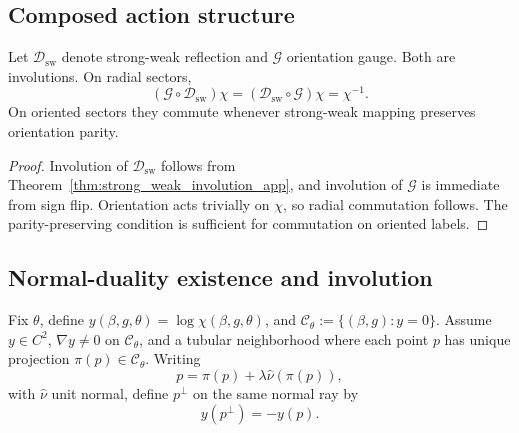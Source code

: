 \subsection{Composed action structure}

\begin{proposition}
\label{prop:composed_action_app}
Let \(\mathcal{D}_{\mathrm{sw}}\) denote strong-weak reflection and
\(\mathcal{G}\) orientation gauge.
Both are involutions.
On radial sectors,
\begin{equation}
  (\mathcal{G}\circ\mathcal{D}_{\mathrm{sw}})\chi
  =(\mathcal{D}_{\mathrm{sw}}\circ\mathcal{G})\chi
  =\chi^{-1}.
\end{equation}
On oriented sectors they commute whenever strong-weak mapping preserves orientation parity.
\end{proposition}
\begin{proof}
Involution of \(\mathcal{D}_{\mathrm{sw}}\) follows from
Theorem~\ref{thm:strong_weak_involution_app}, and involution of \(\mathcal{G}\) is immediate from
sign flip.
Orientation acts trivially on \(\chi\), so radial commutation follows.
The parity-preserving condition is sufficient for commutation on oriented labels.
\end{proof}

\subsection{Normal-duality existence and involution}

\begin{definition}
\label{def:normal_dual_app}
Fix \(\theta\), define \(y(\beta,g,\theta)=\log\chi(\beta,g,\theta)\), and
\(\mathcal{C}_\theta:=\{(\beta,g):y=0\}\).
Assume \(y\in C^2\), \(\nabla y\neq0\) on \(\mathcal{C}_\theta\), and a tubular neighborhood where each
point \(p\) has unique projection \(\pi(p)\in\mathcal{C}_\theta\).
Writing
\begin{equation}
  p=\pi(p)+\lambda\hat\nu(\pi(p)),
\end{equation}
with \(\hat\nu\) unit normal, define \(p^\perp\) on the same normal ray by
\begin{equation}
  y(p^\perp)=-y(p).
\end{equation}
\end{definition}

